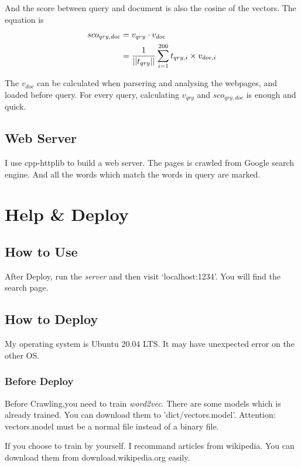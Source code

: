 \documentclass[a4paper]{article}
\begin{document}
And the score between query and document is also the cosine of the vectors. The equation is
\begin{equation}
\begin{aligned}
sco_{qry,doc} & =v_{qry}\cdot v_{doc} \\
& =\frac{1}{||t_{qry}||}\sum_{i=1}^{200}t_{qry,i}\times v_{doc,i} \notag
\end{aligned}
\end{equation}

The $v_{doc}$ can be calculated when parsering and analysing the webpages, and loaded before query. For every query, calculating $v_{qry}$ and $sco_{qry,doc}$ is enough and quick.


\subsection{Web Server}

I use cpp-httplib to build a web server. The pages is crawled from Google search engine. And all the words which match the words in query are marked.

\section{Help \& Deploy}

\subsection{How to Use}

After Deploy, run the \emph{server} and then visit `localhost:1234'. You will find the search page.

\subsection{How to Deploy}

My operating system is Ubuntu 20.04 LTS. It may have unexpected error on the other OS.

\subsubsection{Before Deploy}

Before Crawling,you need to train \emph{word2vec}. There are some models which is already trained. You can download them to 'dict/vectors.model'. Attention: vectors.model must be a normal file instead of a binary file.

If you choose to train by yourself. I recommand articles from wikipedia. You can download them from download.wikipedia.org easily.
\end{document}
